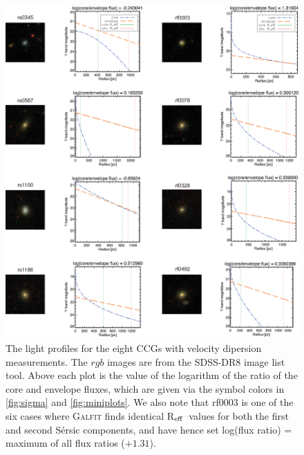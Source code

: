 \documentclass[iop,apj]{emulateapj}
\newcommand{\Reff}{R$_{\rm eff}$}
\begin{document}
\begin{figure}[b]
\begin{center}
\includegraphics[scale=0.7]{imageplots.eps}
\caption{The light profiles for the eight CCGs with velocity dipersion measurements. The $rgb$ images are from the SDSS-DR8 image list tool. Above each plot is the value of the logarithm of the ratio of the core and envelope fluxes, which are given via the symbol colors in \autoref{fig:sigma} and \autoref{fig:miniplots}. We also note that rf0003 is one of the six cases where \textsc{Galfit} finds identical \Reff\ values for both the first and second S\'ersic components, and have hence set log(flux ratio) = maximum of all flux ratios ($+1.31$).}
\label{fig:imageplots}
\end{center}
\end{figure}


\end{document}

